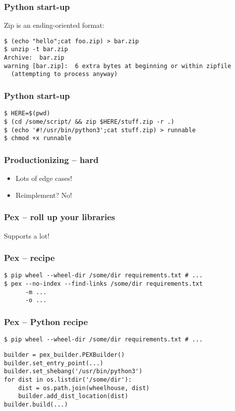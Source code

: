 \begin{frame}
\frametitle{Python start-up}
Zip is an ending-oriented format:
\begin{lstlisting}
$ (echo "hello";cat foo.zip) > bar.zip
$ unzip -t bar.zip 
Archive:  bar.zip
warning [bar.zip]:  6 extra bytes at beginning or within zipfile
  (attempting to process anyway)
\end{lstlisting}
\end{frame}

\begin{frame}
\frametitle{Python start-up}
\begin{lstlisting}
$ HERE=$(pwd)
$ (cd /some/script/ && zip $HERE/stuff.zip -r .)
$ (echo '#!/usr/bin/python3';cat stuff.zip) > runnable
$ chmod +x runnable
\end{lstlisting}
\end{frame}

\begin{frame}
\frametitle{Productionizing -- hard}
\begin{itemize}
\item Lots of edge cases!
\item Reimplement? No!
\end{itemize}
\end{frame}

\begin{frame}
\frametitle{Pex -- roll up your libraries}
Supports a lot!
\end{frame}

\begin{frame}
\frametitle{Pex -- recipe}
\begin{lstlisting}
$ pip wheel --wheel-dir /some/dir requirements.txt # ...
$ pex --no-index --find-links /some/dir requirements.txt
      -m ...
      -o ...
\end{lstlisting}
\end{frame}

\begin{frame}
\frametitle{Pex -- Python recipe}
\begin{lstlisting}
$ pip wheel --wheel-dir /some/dir requirements.txt # ...
\end{lstlisting}

\begin{lstlisting}
builder = pex_builder.PEXBuilder()
builder.set_entry_point(...)
builder.set_shebang('/usr/bin/python3')
for dist in os.listdir('/some/dir'):
    dist = os.path.join(wheelhouse, dist)
    builder.add_dist_location(dist)
builder.build(...)
\end{lstlisting}
\end{frame}


